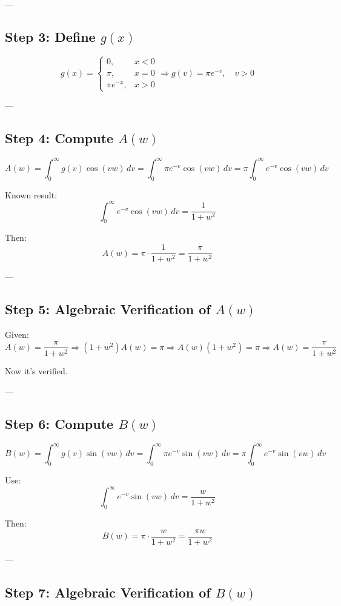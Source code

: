 \documentclass{article}
\begin{document}
---

\subsection*{Step 3: Define \( g(x) \)}

\[
g(x) =
\begin{cases}
0, & x < 0 \\
\pi, & x = 0 \\
\pi e^{-x}, & x > 0
\end{cases}
\Rightarrow g(v) = \pi e^{-v}, \quad v > 0
\]

---

\subsection*{Step 4: Compute \( A(w) \)}

\[
A(w) = \int_0^\infty g(v) \cos(vw) \, dv
= \int_0^\infty \pi e^{-v} \cos(vw) \, dv
= \pi \int_0^\infty e^{-v} \cos(vw) \, dv
\]

Known result:
\[
\int_0^\infty e^{-v} \cos(vw) \, dv = \frac{1}{1 + w^2}
\]

Then:
\[
A(w) = \pi \cdot \frac{1}{1 + w^2}
= \frac{\pi}{1 + w^2}
\]

---

\subsection*{Step 5: Algebraic Verification of \( A(w) \)}

Given:
\[
A(w) = \frac{\pi}{1 + w^2}
\Rightarrow (1 + w^2)A(w) = \pi
\Rightarrow A(w)(1 + w^2) = \pi
\Rightarrow A(w) = \frac{\pi}{1 + w^2}
\]

Now it's verified.

---

\subsection*{Step 6: Compute \( B(w) \)}

\[
B(w) = \int_0^\infty g(v) \sin(vw) \, dv = \int_0^\infty \pi e^{-v} \sin(vw) \, dv = \pi \int_0^\infty e^{-v} \sin(vw) \, dv
\]

Use:
\[
\int_0^\infty e^{-v} \sin(vw) \, dv = \frac{w}{1 + w^2}
\]

Then:
\[
B(w) = \pi \cdot \frac{w}{1 + w^2}
= \frac{\pi w}{1 + w^2}
\]

---

\subsection*{Step 7: Algebraic Verification of \( B(w) \)}
\end{document}
